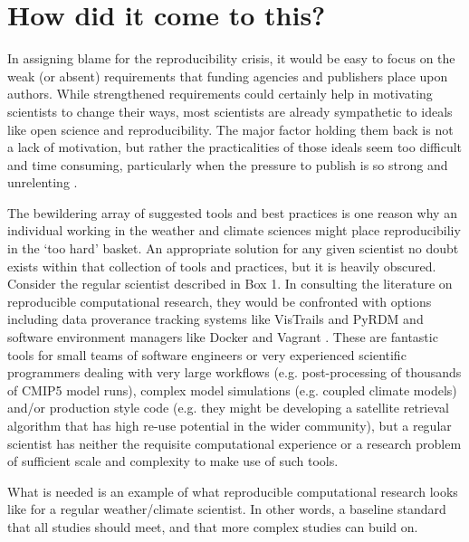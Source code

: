 \section{How did it come to this?}

In assigning blame for the reproducibility crisis, it would be easy to focus on the weak (or absent) requirements that funding agencies and publishers place upon authors. While strengthened requirements could certainly help in motivating scientists to change their ways, most scientists are already sympathetic to ideals like open science and reproducibility. The major factor holding them back is not a lack of motivation, but rather the practicalities of those ideals seem too difficult and time consuming, particularly when the pressure to publish is so strong and unrelenting \citep[e.g.][]{Stodden2010}. 

The bewildering array of suggested tools and best practices is one reason why an individual working in the weather and climate sciences might place reproducibiliy in the `too hard' basket. An appropriate solution for any given scientist no doubt exists within that collection of tools and practices, but it is heavily obscured. Consider the regular scientist described in Box 1. In consulting the literature on reproducible computational research, they would be confronted with options including data proverance tracking systems like VisTrails \citep{Freire2012} and PyRDM \citep{Jacobs2014} and software environment managers like Docker and Vagrant \citep{Stodden2014}. These are fantastic tools for small teams of software engineers or very experienced scientific programmers dealing with very large workflows (e.g. post-processing of thousands of CMIP5 model runs), complex model simulations (e.g. coupled climate models) and/or production style code (e.g. they might be developing a satellite retrieval algorithm that has high re-use potential in the wider community), but a regular scientist has neither the requisite computational experience or a research problem of sufficient scale and complexity to make use of such tools.

What is needed is an example of what reproducible computational research looks like for a regular weather/climate scientist. In other words, a baseline standard that all studies should meet, and that more complex studies can build on.